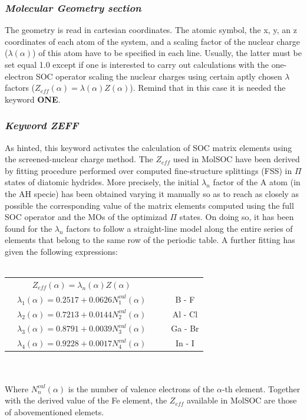 \documentclass[a4paper,12pt]{article}
\begin{document}
\subsubsection{\em Molecular Geometry section}
The geometry is read in cartesian coordinates. The atomic symbol, the x, y, an z 
coordinates of each atom of the system, and a scaling factor of the nuclear charge 
($\lambda(\alpha)$)
of this atom have to be specified in each line. Usually, the latter must be set equal 1.0 
except if one is interested to carry out calculations with the one-electron SOC operator scaling 
the nuclear charges using certain aptly chosen $\lambda$ factors
($Z_{eff}(\alpha) = \lambda(\alpha) Z(\alpha)$). Remind that in this case it is needed the keyword {\bf ONE}.
%
\subsubsection{{\em Keyword ZEFF}}
As hinted, this keyword activates the calculation of SOC matrix elements using 
the screened-nuclear charge method.
The $Z_{eff}$ used in {\sf MolSOC} have been derived by fitting procedure performed 
over computed fine-structure splittings (FSS) in $\Pi$ states of diatomic hydrides\cite{Chiod2}.
More precisely, the initial $\lambda_n$ factor of the A atom (in the AH specie) has been obtained 
varying it manually so as to reach as closely as possible the corresponding value of the matrix 
elements computed using the full SOC operator and the MOs of the optimizad $\Pi$ states.
On doing so, it has been found for the $\lambda_n$ factors to follow a straight-line model along the 
entire series of elements that belong to the same row of the periodic table. A further fitting 
has given the following expressions: \\ \\
\begin{tabular}{ccccc}
& $Z_{eff}(\alpha) = \lambda_n(\alpha)Z(\alpha)$        & & &      \\
& $\lambda_1(\alpha) = 0.2517 + 0.0626N_1^{val}(\alpha)$ & & & B - F \\
& $\lambda_2(\alpha) = 0.7213 + 0.0144N_2^{val}(\alpha)$ & & & Al - Cl \\
& $\lambda_3(\alpha) = 0.8791 + 0.0039N_3^{val}(\alpha)$ & & & Ga - Br \\
& $\lambda_4(\alpha) = 0.9228 + 0.0017N_4^{val}(\alpha)$ & & & In - I \\
\end{tabular} \\ \\
Where $N_n^{val}(\alpha)$ is the number of valence electrons of the $\alpha$-th element.
Together with the derived value of the Fe element, the $Z_{eff}$ available in {\sf MolSOC} 
are those of abovementioned elemets.
%
\end{document}
